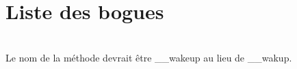 \chapter{Liste des bogues }
\hypertarget{bug}{}\label{bug}

\begin{DoxyRefList}
\item[{\parbox[t]{\linewidth}{Global(e) \doxylink{class_bd_adce4f1eabfa4346336057c4dd46ee8df}{Bd::\+\+\_\+\+\_\+wakup} ()}}]\hfill \\
\label{bug__bug000001}%
%
Le nom de la méthode devrait être \+\_\+\+\_\+wakeup au lieu de \+\_\+\+\_\+wakup. 
\end{DoxyRefList}